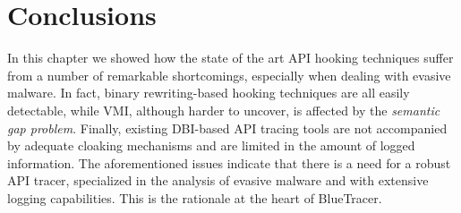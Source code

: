 \section{Conclusions}

In this chapter we showed how the state of the art API hooking techniques suffer from a number of remarkable shortcomings, especially when dealing with evasive malware. In fact, binary rewriting-based hooking techniques are all easily detectable, while VMI, although harder to uncover, is affected by the \textit{semantic gap problem}. Finally, existing DBI-based API tracing tools are not accompanied by adequate cloaking mechanisms and are limited in the amount of logged information. The aforementioned issues indicate that there is a need for a robust API tracer, specialized in the analysis of evasive malware and with extensive logging capabilities. This is the rationale at the heart of BlueTracer. 